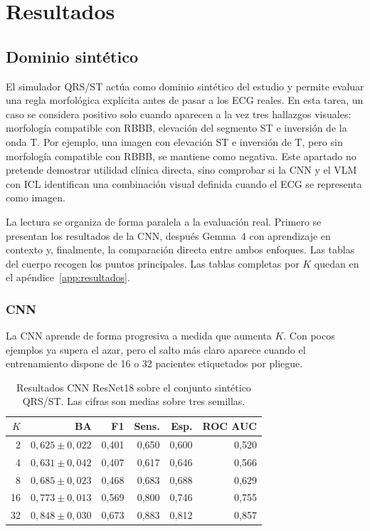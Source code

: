 \chapter{Resultados}
\label{chap:resultados}

\section{Dominio sintético}
\label{chap:comparacion_simulador}

El simulador QRS/ST actúa como dominio sintético del estudio y permite evaluar una regla morfológica explícita antes de pasar a los ECG reales. En esta tarea, un caso se considera positivo solo cuando aparecen a la vez tres hallazgos visuales: morfología compatible con RBBB, elevación del segmento ST e inversión de la onda T. Por ejemplo, una imagen con elevación ST e inversión de T, pero sin morfología compatible con RBBB, se mantiene como negativa. Este apartado no pretende demostrar utilidad clínica directa, sino comprobar si la CNN y el VLM con ICL identifican una combinación visual definida cuando el ECG se representa como imagen.

La lectura se organiza de forma paralela a la evaluación real. Primero se presentan los resultados de la CNN, después Gemma~4 con aprendizaje en contexto y, finalmente, la comparación directa entre ambos enfoques. Las tablas del cuerpo recogen los puntos principales. Las tablas completas por \(K\) quedan en el apéndice~\ref{app:resultados}.

\subsection{CNN}

La CNN aprende de forma progresiva a medida que aumenta \(K\). Con pocos ejemplos ya supera el azar, pero el salto más claro aparece cuando el entrenamiento dispone de 16 o 32 pacientes etiquetados por pliegue.

\begin{table}[H]
  \centering
  \small
  \begin{tabular}{rrrrrr}
    \toprule
    \(K\) & BA & F1 & Sens. & Esp. & ROC AUC \\
    \midrule
    2  & \(0,625 \pm 0,022\) & 0,401 & 0,650 & 0,600 & 0,520 \\
    4  & \(0,631 \pm 0,042\) & 0,407 & 0,617 & 0,646 & 0,566 \\
    8  & \(0,685 \pm 0,023\) & 0,468 & 0,683 & 0,688 & 0,629 \\
    16 & \(0,773 \pm 0,013\) & 0,569 & 0,800 & 0,746 & 0,755 \\
    32 & \(0,848 \pm 0,030\) & 0,673 & 0,883 & 0,812 & 0,857 \\
    \bottomrule
  \end{tabular}
  \caption{Resultados CNN ResNet18 sobre el conjunto sintético QRS/ST. Las cifras son medias sobre tres semillas.}
  \label{tab:resultados_sinteticos_finales}
\end{table}

